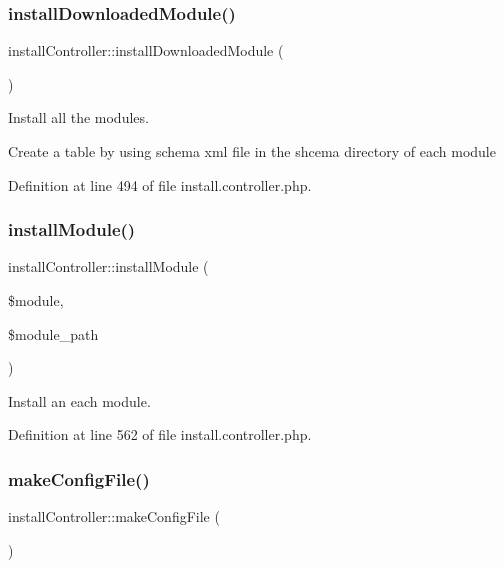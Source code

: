 \subsubsection{\texorpdfstring{install\+Downloaded\+Module()}{installDownloadedModule()}}
{\footnotesize\ttfamily install\+Controller\+::install\+Downloaded\+Module (\begin{DoxyParamCaption}{ }\end{DoxyParamCaption})}



Install all the modules. 

Create a table by using schema xml file in the shcema directory of each module 

Definition at line 494 of file install.\+controller.\+php.

\mbox{\label{classinstallController_a97c582da1e115f0db5256f02d22efc88}} 
\subsubsection{\texorpdfstring{install\+Module()}{installModule()}}
{\footnotesize\ttfamily install\+Controller\+::install\+Module (\begin{DoxyParamCaption}\item[{}]{\$module,  }\item[{}]{\$module\+\_\+path }\end{DoxyParamCaption})}



Install an each module. 



Definition at line 562 of file install.\+controller.\+php.

\mbox{\label{classinstallController_a1ccad92dd450d67e90a2efdde0f6b78a}} 
\subsubsection{\texorpdfstring{make\+Config\+File()}{makeConfigFile()}}
{\footnotesize\ttfamily install\+Controller\+::make\+Config\+File (\begin{DoxyParamCaption}{ }\end{DoxyParamCaption})}



